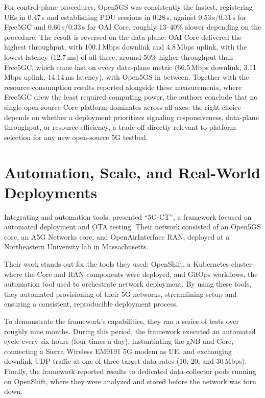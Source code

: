 For control-plane procedures, Open5GS was consistently the fastest, registering \glspl{UE} in 0.47\,s and establishing \gls{PDU} sessions in 0.28\,s, against 0.53\,s/0.31\,s for Free5GC and 0.66\,s/0.33\,s for \gls{OAI} Core, roughly 13--40\% slower depending on the procedure. The result is reversed on the data plane: \gls{OAI} Core delivered the highest throughput, with 100.1\,Mbps downlink and 4.8\,Mbps uplink, with the lowest latency (12.7\,ms) of all three, around 50\% higher throughput than Free5GC, which came last on every data-plane metric (66.5\,Mbps downlink, 3.11\,Mbps uplink, 14.14\,ms latency), with Open5GS in between. Together with the resource-consumption results reported alongside these measurements, where Free5GC drew the least required computing power, the authors conclude that no single open-source Core platform dominates across all axes: the right choice depends on whether a deployment prioritizes signaling responsiveness, data-plane throughput, or resource efficiency, a trade-off directly relevant to platform selection for any new open-source 5G testbed.

\section{Automation, Scale, and Real-World Deployments}
\label{sec:related_automation_scale}

Integrating  and automation tools, \textcite{bonati2025_5gct} presented ``5G-CT'', a framework focused on automated deployment and \gls{OTA} testing. Their network consisted of an Open5GS core, an A5G Networks core, and OpenAirInterface \gls{RAN}, deployed at a Northeastern University lab in Massachusetts.

Their work stands out for the tools they used: OpenShift, a Kubernetes cluster where the Core and \gls{RAN} components were deployed, and GitOps workflows, the automation tool used to orchestrate network deployment. By using these tools, they automated provisioning of their 5G networks, streamlining setup and ensuring a consistent, reproducible deployment process.

To demonstrate the framework's capabilities, they ran a series of tests over roughly nine months. During this period, the framework executed an automated cycle every six hours (four times a day), instantiating the \gls{gNB} and Core, connecting a Sierra Wireless EM9191 5G modem as \gls{UE}, and exchanging downlink UDP traffic at one of three target data rates (10, 20, and 30\,Mbps). Finally, the framework reported results to dedicated data-collector pods running on OpenShift, where they were analyzed and stored before the network was torn down.

